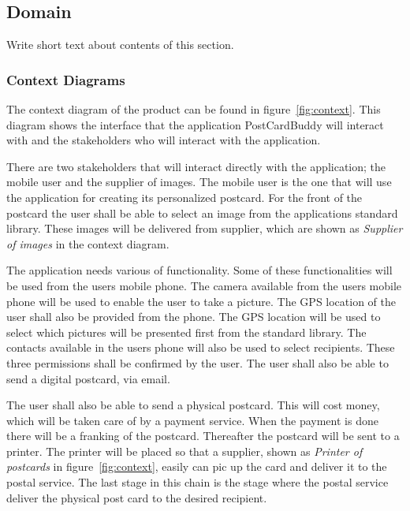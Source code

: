 \documentclass[10pt,a4paper]{article}
\begin{document}
\subsection{Domain}
Write short text about contents of this section.

\subsubsection{Context Diagrams}
The context diagram of the product can be found in figure~\ref{fig:context}. This diagram shows the interface that the application PostCardBuddy will interact with and the stakeholders who will interact with the application.

There are two stakeholders that will interact directly with the application; the mobile user and the supplier of images. The mobile user is the one that will use the application for creating its personalized postcard. For the front of the postcard the user shall be able to select an image from the applications standard library. These images will be delivered from supplier, which are shown as \textit{Supplier of images} in the context diagram. 

The application needs various of functionality. Some of these functionalities will be used from the users mobile phone. The camera available from the users mobile phone will be used to enable the user to take a picture. The GPS location of the user shall also be provided from the phone. The GPS location will be used to select which pictures will be presented first from the standard library. The contacts available in the users phone will also be used to select recipients. These three permissions shall be confirmed by the user. The user shall also be able to send a digital postcard, via email. 

The user shall also be able to send a physical postcard. This will cost money, which will be taken care of by a payment service. When the payment is done there will be a franking of the postcard. Thereafter the postcard will be sent to a printer. The printer will be placed so that a supplier, shown as \textit{Printer of postcards} in figure~\ref{fig:context}, easily can pic up the card and deliver it to the postal service. The last stage in this chain is the stage where the postal service deliver the physical post card to the desired recipient. 
\end{document}
